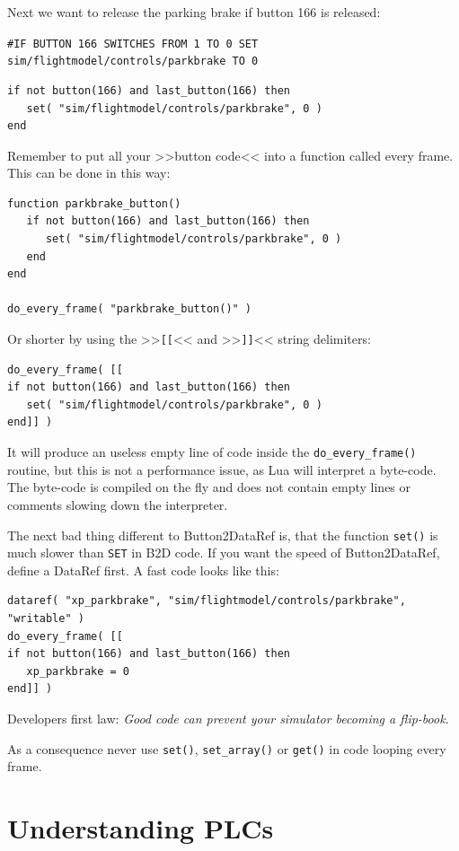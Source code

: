\documentclass[11pt,parskip=half,a4paper]{scrartcl}
\begin{document}
Next we want to release the parking brake if button 166 is released:

\verb|#IF BUTTON 166 SWITCHES FROM 1 TO 0 SET sim/flightmodel/controls/parkbrake TO 0|
\begin{lstlisting}
if not button(166) and last_button(166) then
   set( "sim/flightmodel/controls/parkbrake", 0 )
end
\end{lstlisting}

Remember to put all your >>button code<< into a function called every frame. This can be done in this way:

\begin{lstlisting}
function parkbrake_button()
   if not button(166) and last_button(166) then
      set( "sim/flightmodel/controls/parkbrake", 0 )
   end
end

do_every_frame( "parkbrake_button()" )
\end{lstlisting}

Or shorter by using the >>\verb|[[|<< and >>\verb|]]|<< string delimiters:

\begin{lstlisting}
do_every_frame( [[
if not button(166) and last_button(166) then
   set( "sim/flightmodel/controls/parkbrake", 0 )
end]] )
\end{lstlisting}

It will produce an useless empty line of code inside the \verb|do_every_frame()| routine, but this is not a performance issue, as Lua will interpret a byte-code. The byte-code is compiled on the fly and does not contain empty lines or comments slowing down the interpreter.

The next bad thing different to Button2DataRef is, that the function \verb|set()| is much slower than \verb|SET| in B2D code. If you want the speed of Button2DataRef, define a DataRef first. A fast code looks like this:

\begin{lstlisting}
dataref( "xp_parkbrake", "sim/flightmodel/controls/parkbrake", "writable" )
do_every_frame( [[
if not button(166) and last_button(166) then
   xp_parkbrake = 0
end]] )
\end{lstlisting}

Developers first law: \emph{Good code can prevent your simulator becoming a flip-book}.

As a consequence never use \verb|set()|, \verb|set_array()| or \verb|get()| in code looping every frame.

\newpage
\section{Understanding PLCs}
\end{document}
